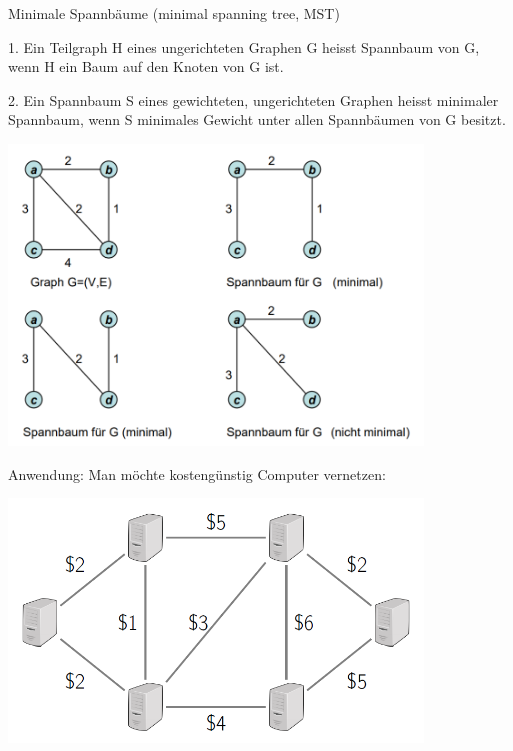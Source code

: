 \begin{frame}[fragile]
Minimale Spannbäume (minimal spanning tree, MST)

1. Ein Teilgraph H eines ungerichteten Graphen G heisst Spannbaum von G, wenn H ein Baum auf den Knoten von
G ist. 

2. Ein Spannbaum S eines gewichteten, ungerichteten Graphen heisst minimaler Spannbaum, wenn S minimales Gewicht unter allen Spannbäumen von G besitzt.

\end{frame}
\begin{frame}[fragile]

\includegraphics[width=11cm]{bild46.png}

\end{frame}


\begin{frame}[fragile]
Anwendung: Man möchte kostengünstig Computer vernetzen:

\includegraphics[width=11cm]{bild47.png}

\end{frame}

